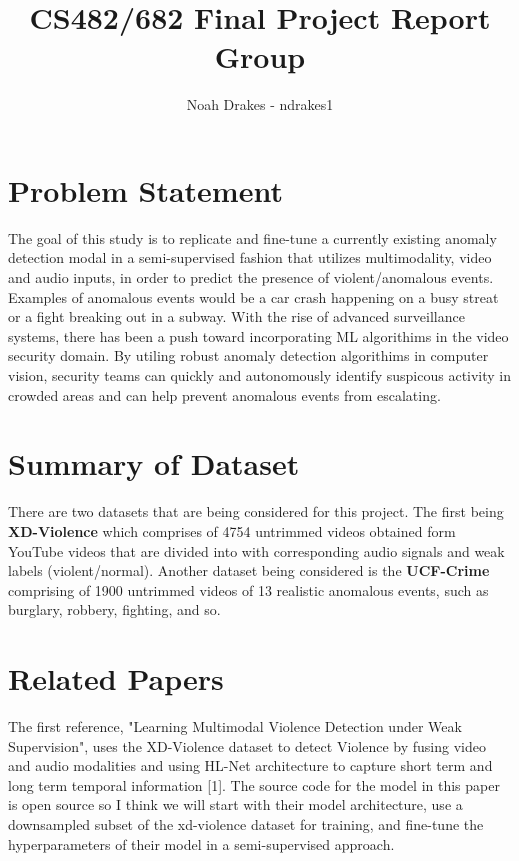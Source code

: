 \documentclass[twocolumn]{article}
\title{CS482/682 Final Project Report Group \todo{XX}\\
	\large \todo{your project title here}}
\author{Noah Drakes - ndrakes1}
\date{}
\newcommand{\todo}[1]{\textcolor{red}{#1}}
\begin{document}
	
	\maketitle
	
	\section{Problem Statement}
	
	The goal of this study is to replicate and fine-tune a currently existing anomaly detection modal in a semi-supervised fashion that utilizes multimodality, 
	video and audio inputs, in order to predict the presence of violent/anomalous events. Examples of anomalous 
	events would be a car crash happening on a busy streat or a fight breaking out in a subway. With the rise of advanced
	surveillance systems, there has been a push toward incorporating ML algorithims in the video security domain. 
	By utiling robust anomaly detection algorithims in computer vision, security teams can quickly and autonomously identify 
	suspicous activity in crowded areas and can help prevent anomalous events from escalating.

	
	\section{Summary of Dataset}
	There are two datasets that are being considered for this project. The first being \textbf{XD-Violence} which
	comprises of 4754 untrimmed videos obtained form YouTube videos that are divided into with corresponding audio signals and weak labels (violent/normal).
	 Another dataset being considered is the \textbf{UCF-Crime} comprising of 1900 untrimmed videos of 13 realistic anomalous events, such as burglary, robbery, fighting, and so. 

	\section{Related Papers}
	The first reference, "Learning Multimodal Violence Detection under Weak Supervision", uses the XD-Violence dataset to detect Violence
	by fusing video and audio modalities and using HL-Net architecture to capture short term and long term temporal information [1]. The source code for the model in this paper is open source 
	so I think we will start with their model architecture, use a downsampled subset of the xd-violence 
	dataset for training, and fine-tune the hyperparameters of their model in a semi-supervised approach.
\end{document}
